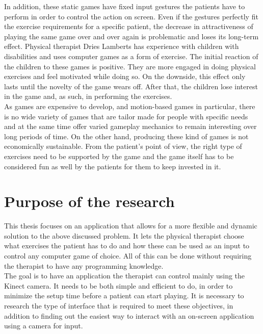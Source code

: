 In addition, these static games have fixed input gestures the patients have to perform in order to control the action on screen. Even if the gestures perfectly fit the exercise requirements for a specific patient, the decrease in attractiveness of playing the same game over and over again is problematic and loses its long-term effect. Physical therapist Dries Lamberts has experience with children with disabilities and uses computer games as a form of exercise. The initial reaction of the children to these games is positive. They are more engaged in doing physical exercises and feel motivated while doing so. On the downside, this effect only lasts until the novelty of the game wears off. After that, the children lose interest in the game and, as such, in performing the exercises.\\

As games are expensive to develop, and motion-based games in particular, there is no wide variety of games that are tailor made for people with specific needs and at the same time offer varied gameplay mechanics to remain interesting over long periods of time. On the other hand, producing these kind of games is not economically sustainable. From the patient's point of view, the right type of exercises need to be supported by the game and the game itself has to be considered fun as well by the patients for them to keep invested in it.


\section{Purpose of the research}

This thesis focuses on an application that allows for a more flexible and dynamic solution to the above discussed problem. It lets the physical therapist choose what exercises the patient has to do and how these can be used as an input to control any computer game of choice. All of this can be done without requiring the therapist to have any programming knowledge.\\

The goal is to have an application the therapist can control mainly using the Kinect camera. It needs to be both simple and efficient to do, in order to minimize the setup time before a patient can start playing. It is necessary to research the type of interface that is required to meet these objectives, in addition to finding out the easiest way to interact with an on-screen application using a camera for input.